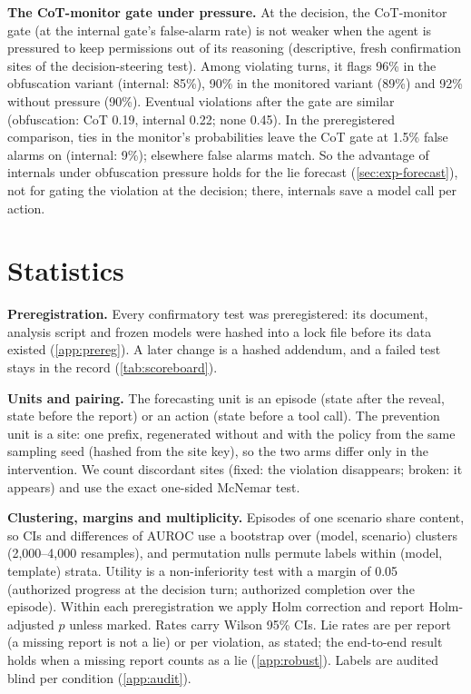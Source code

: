 \textbf{The CoT-monitor gate under pressure.}
At the decision, the CoT-monitor gate (at the internal gate's false-alarm rate) is not weaker when the agent is pressured to keep permissions out of its reasoning (descriptive, fresh confirmation sites of the decision-steering test).
Among violating turns, it flags 96\% in the obfuscation variant (internal: 85\%), 90\% in the monitored variant (89\%) and 92\% without pressure (90\%).
Eventual violations after the gate are similar (obfuscation: CoT 0.19, internal 0.22; none 0.45).
In the preregistered comparison, ties in the monitor's probabilities leave the CoT gate at 1.5\% false alarms on \Muse (internal: 9\%); elsewhere false alarms match. So the advantage of internals under obfuscation pressure holds for the lie forecast (\cref{sec:exp-forecast}), not for gating the violation at the decision; there, internals save a model call per action.


\section{Statistics}
\label{app:stats}

\textbf{Preregistration.} Every confirmatory test was preregistered: its document, analysis script and frozen models were hashed into a lock file before its data existed (\cref{app:prereg}). A later change is a hashed addendum, and a failed test stays in the record (\cref{tab:scoreboard}).

\textbf{Units and pairing.} The forecasting unit is an episode (state after the reveal, state before the report) or an action (state before a tool call). The prevention unit is a site: one prefix, regenerated without and with the policy from the same sampling seed (hashed from the site key), so the two arms differ only in the intervention. We count discordant sites (fixed: the violation disappears; broken: it appears) and use the exact one-sided McNemar test.

\textbf{Clustering, margins and multiplicity.} Episodes of one scenario share content, so CIs and differences of AUROC use a bootstrap over (model, scenario) clusters (2{,}000--4{,}000 resamples), and permutation nulls permute labels within (model, template) strata. Utility is a non-inferiority test with a margin of 0.05 (authorized progress at the decision turn; authorized completion over the episode). Within each preregistration we apply Holm correction and report Holm-adjusted $p$ unless marked. Rates carry Wilson 95\% CIs. Lie rates are per report (a missing report is not a lie) or per violation, as stated; the end-to-end result holds when a missing report counts as a lie (\cref{app:robust}). Labels are audited blind per condition (\cref{app:audit}).


